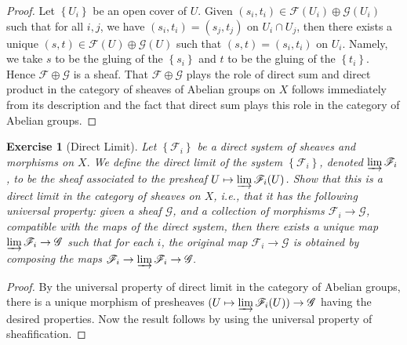 \documentclass{amsart}
\newtheorem{exe}{Exercise}[subsection]
\begin{document}
\begin{proof}
               Let $\left\{U_{i}\right\}$ be an open cover of $U$. Given $\left(s_{i}, t_{i}\right) \in \mathscr{F}\left(U_{i}\right) \oplus \mathscr{G}\left(U_{i}\right)$ such that for all $i, j$, we have $\left(s_{i}, t_{i}\right)=\left(s_{j}, t_{j}\right)$ on $U_{i} \cap U_{j}$, then there exists a unique $(s, t) \in \mathscr{F}(U) \oplus \mathscr{G}(U)$ such that $(s, t)=\left(s_{i}, t_{i}\right)$ on $U_{i} .$ Namely, we take $s$ to be the gluing of the $\left\{s_{i}\right\}$ and $t$ to be the gluing of the $\left\{t_{i}\right\} .$ Hence $\mathscr{F} \oplus \mathscr{G}$ is a sheaf.    
               That $\mathscr{F} \oplus \mathscr{G}$ plays the role of direct sum and direct product in the category of sheaves of Abelian groups on $X$ follows immediately from its description and the fact that direct sum plays this role in the category of Abelian groups.
\end{proof}

\begin{exe}[Direct Limit]
	\label{2.1.10}
               Let $\left\{\mathscr{F}_{i}\right\}$ be a direct system of sheaves and morphisms on $X .$ We define the direct limit of the system $\left\{\mathscr{F}_{i}\right\}$, denoted $\varinjlim\mathscr{F}_{i}$, to be the sheaf associated to the presheaf $U \mapsto \varinjlim \mathscr{F}_{i}(U)$. Show that this is a direct limit in the category of sheaves on $X$, i.e., that it has the following universal property: given a sheaf $\mathscr{G}$, and a collection of morphisms $\mathscr{F}_{i} \rightarrow \mathscr{G}$, compatible with the maps of the direct
system, then there exists a unique map $\varinjlim \mathscr{F}_{i} \rightarrow \mathscr{G}$ such that for each $i$, the original map $\mathscr{F}_{i} \rightarrow \mathscr{G}$ is obtained by composing the maps $\mathscr{F}_{i} \rightarrow \varinjlim \mathscr{F}_{i} \rightarrow \mathscr{G} .$
\end{exe}

\begin{proof}
               By the universal property of direct limit in the category of Abelian groups, there is a unique morphism of presheaves $(U\mapsto\varinjlim \mathscr{F}_{i}(U))\rightarrow\mathscr{G}$ having the desired properties. Now the result follows by using the universal property of sheafification.
\end{proof}
\end{document}
